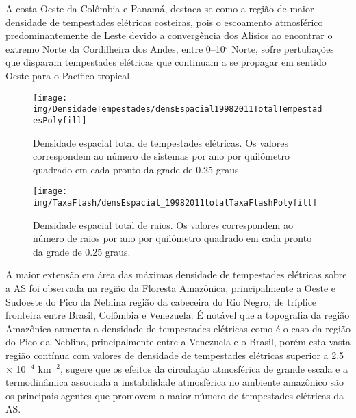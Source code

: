 A costa Oeste da Colômbia e Panamá, destaca-se como a região de maior densidade de tempestades elétricas costeiras, pois o escoamento atmosférico predominantemente de Leste devido a convergência dos Alísios ao encontrar o extremo Norte da Cordilheira dos Andes, entre 0--10$^{\circ}$ Norte, sofre pertubações que disparam tempestades elétricas que continuam a se propagar em sentido Oeste para o Pacífico tropical.  

\begin{figure}[!ht]
 \centering
 {\texttt{[image: img/DensidadeTempestades/densEspacial19982011TotalTempestadesPolyfill]}}
\caption{Densidade espacial total de tempestades elétricas. Os valores correspondem ao número de sistemas por ano por quilômetro quadrado em cada pronto da grade de 0.25 graus.}
 \label{densidadeTempestade}
\end{figure}
  
\begin{figure}[!ht]
 \centering
  {\texttt{[image: img/TaxaFlash/densEspacial\_19982011totalTaxaFlashPolyfill]}}
  \caption{Densidade espacial total de raios. Os valores correspondem ao número de raios por ano por quilômetro quadrado em cada pronto da grade de 0.25 graus.}
  \label{densidadeRaios}
\end{figure}


A maior extensão em área das máximas densidade de tempestades elétricas sobre a AS foi observada na região da Floresta Amazônica, principalmente a Oeste e Sudoeste do Pico da Neblina região da cabeceira do Rio Negro, de tríplice fronteira entre Brasil, Colômbia e Venezuela. É notável que a topografia da região Amazônica aumenta a densidade de tempestades elétricas como é o caso da região do Pico da Neblina, principalmente entre a Venezuela e o Brasil, porém esta vasta região contínua com valores de densidade de tempestades elétricas superior a  2.5 $\times$ 10$^{-4}$ km$^{-2}$, sugere que os efeitos da circulação atmosférica de grande escala e a termodinâmica associada a instabilidade atmosférica no ambiente amazônico são os principais agentes que promovem o maior número de tempestades elétricas da AS. 



